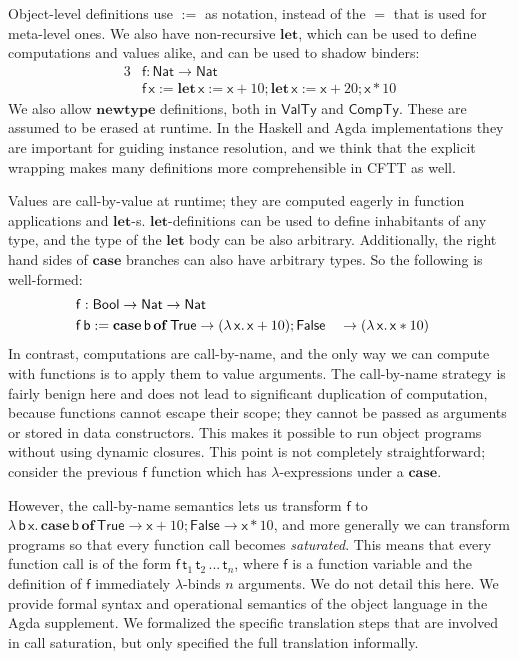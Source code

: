 \documentclass[acmsmall]{acmart}
\newcommand{\msf}[1]{{\mathsf{#1}}}
\newcommand{\mbf}[1]{{\mathbf{#1}}}
\newcommand{\lam}{\lambda\,}
\newcommand{\of}{\mbf{of}\,}
\newcommand{\letdef}{\mbf{let\,}}
\newcommand{\vb}{\mathsf{b}}
\newcommand{\vx}{\mathsf{x}}
\newcommand{\vf}{\mathsf{f}}
\newcommand{\vt}{\mathsf{t}}
\newcommand{\Bool}{\msf{Bool}}
\newcommand{\case}{\mbf{case\,}}
\newcommand{\VTy}{\msf{ValTy}}
\newcommand{\CTy}{\msf{CompTy}}
\newcommand{\True}{\msf{True}}
\newcommand{\False}{\msf{False}}
\newcommand{\Nat}{\msf{Nat}}
\theoremstyle{remark}
\begin{document}
Object-level definitions use $:=$ as notation, instead of the $=$ that is used
for meta-level ones. We also have non-recursive $\mbf{let}$, which can be used
to define computations and values alike, and can be used to shadow binders:
\begin{alignat*}{3}
  &\vf : \Nat \to \Nat\\
  &\vf\,\vx := \letdef \vx := \vx + 10; \letdef \vx := \vx + 20; \vx * 10
\end{alignat*}
We also allow $\mbf{newtype}$ definitions, both in $\VTy$ and $\CTy$. These are
assumed to be erased at runtime. In the Haskell and Agda implementations they
are important for guiding instance resolution, and we think that the explicit
wrapping makes many definitions more comprehensible in CFTT as well.

Values are call-by-value at runtime; they are computed eagerly in function
applications and $\mbf{let}$-s. $\mbf{let}$-definitions can be used to define
inhabitants of any type, and the type of the $\mbf{let}$ body can be also
arbitrary. Additionally, the right hand sides of $\mbf{case}$ branches can also
have arbitrary types. So the following is well-formed:
\begin{alignat*}{3}
  &\vf : \mathrlap{\Bool \to \Nat \to \Nat}\\
  &\vf\,\vb := \case \vb\,\of \True \to (\lam \vx.\, \vx + 10); \False &&\to (\lam \vx.\, \vx * 10)
\end{alignat*}
In contrast, computations are call-by-name, and the only way we can compute with
functions is to apply them to value arguments. The call-by-name strategy is
fairly benign here and does not lead to significant duplication of computation,
because functions cannot escape their scope; they cannot be passed as arguments
or stored in data constructors. This makes it possible to run object programs
without using dynamic closures. This point is not completely straightforward;
consider the previous $\vf$ function which has $\lambda$-expressions under a
$\mbf{case}$.

However, the call-by-name semantics lets us transform $\vf$ to $\lam
\vb\,\vx.\,\case \vb\,\of \True \to \vx + 10; \False \to \vx * 10$, and more
generally we can transform programs so that every function call becomes
\emph{saturated}. This means that every function call is of the form
$\vf\,\vt_1\,\vt_2\,...\,\vt_n$, where $\vf$ is a function variable and the
definition of $\vf$ immediately $\lambda$-binds $n$ arguments. We do not detail
this here. We provide formal syntax and operational semantics of the object
language in the Agda supplement. We formalized the specific translation steps
that are involved in call saturation, but only specified the full translation
informally.
\end{document}
